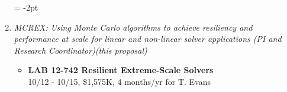 \begin{enumerate}
  \vspace{-2ex}
  \parskip = -2pt

\item{\em MCREX: Using Monte Carlo algorithms to achieve resiliency 
    and performance at scale for linear and non-linear solver
    applications (PI and Research Coordinator)(this proposal)}
  \begin{itemize}
  \item
    {\bf LAB 12-742 Resilient Extreme-Scale Solvers}\\
    10/12 - 10/15, \$1,575K, 4 months/yr for T. Evans
  \end{itemize}
  
\end{enumerate}



